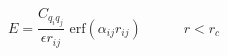 \documentclass[12pt]{article}
\begin{document}
$$
  E = \frac{C_{q_i q_j}}{\epsilon r_{ij}}\,\, \textrm{erf}\left(\alpha_{ij} r_{ij}\right)\quad\quad\quad r < r_c
$$
\end{document}
